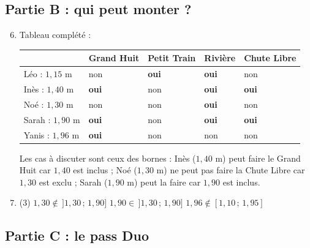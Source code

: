 \documentclass{article}
\newcommand{\oui}{\textcolor{green!50!black}{\textbf{oui}}}
\newcommand{\non}{\textcolor{red!70!black}{non}}
\begin{document}
\newpage

\subsection*{Partie B : qui peut monter ?}

\begin{enumerate}[resume]
  \setcounter{enumi}{5}
  \item Tableau complété :
  \begin{center}
    \renewcommand{\arraystretch}{1.6}
    \begin{tabular}{|C{3cm}|C{2.6cm}|C{2.6cm}|C{2.6cm}|C{2.6cm}|}
      \hline
      & \textbf{Grand Huit} & \textbf{Petit Train} & \textbf{Rivière} & \textbf{Chute Libre} \\ \hline
      Léo : $1{,}15$ m & \non & \oui & \oui & \non \\ \hline
      Inès : $1{,}40$ m & \oui & \non & \oui & \oui \\ \hline
      Noé : $1{,}30$ m & \non & \non & \oui & \non \\ \hline
      Sarah : $1{,}90$ m & \oui & \non & \oui & \oui \\ \hline
      Yanis : $1{,}96$ m & \oui & \non & \non & \non \\ \hline
    \end{tabular}
  \end{center}

  Les cas à discuter sont ceux des bornes : Inès ($1{,}40$ m) peut faire le Grand Huit car $1{,}40$ est inclus ; Noé ($1{,}30$ m) ne peut pas faire la Chute Libre car $1{,}30$ est exclu ; Sarah ($1{,}90$ m) peut la faire car $1{,}90$ est inclus.

  \item
  \begin{tasks}(3)
    \task $1{,}30 \notin\, ]1{,}30\,;\,1{,}90]$
    \task $1{,}90 \in\, ]1{,}30\,;\,1{,}90]$
    \task $1{,}96 \notin [1{,}10\,;\,1{,}95]$
  \end{tasks}
\end{enumerate}

\subsection*{Partie C : le pass \og Duo \fg{}}
\end{document}
